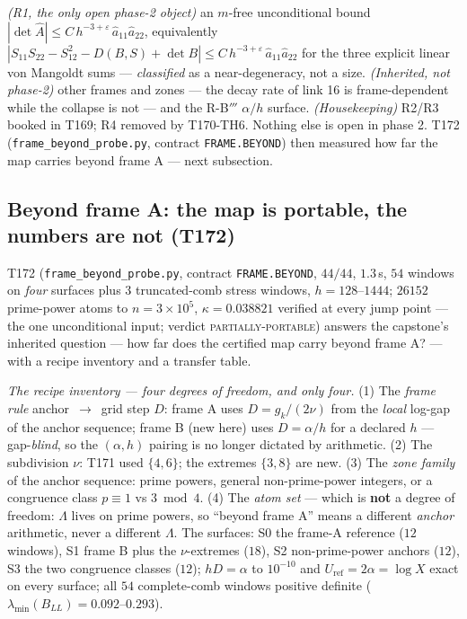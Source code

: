 \documentclass[11pt,a4paper]{article}
\begin{document}
\begin{keybox}
\emph{(R1, the only open phase-2 object)} an $m$-free unconditional
bound $|\det\hat A|\le C\,h^{-3+\varepsilon}\,\hat a_{11}\hat a_{22}$,
equivalently $|S_{11}S_{22}-S_{12}^2-D(B,S)+\det B|\le C\,
h^{-3+\varepsilon}\,\hat a_{11}\hat a_{22}$ for the three explicit
linear von Mangoldt sums --- \emph{classified} as a near-degeneracy,
not a size. \emph{(Inherited, not phase-2)} other frames and zones ---
the decay rate of link 16 is frame-dependent while the collapse is not
--- and the R-B$'''$ $\alpha/h$ surface. \emph{(Housekeeping)} R2/R3
booked in T169; R4 removed by T170-TH6. Nothing else is open in phase
2. T172 (\texttt{frame\_beyond\_probe.py}, contract
\texttt{FRAME.BEYOND}) then measured how far the map carries beyond
frame A --- next subsection.
\end{keybox}

\subsection{Beyond frame A: the map is portable, the numbers are not
(T172)}\label{sec:t172}
T172 (\texttt{frame\_beyond\_probe.py}, contract \texttt{FRAME.BEYOND},
$44/44$, $1.3$\,s, $54$ windows on \emph{four} surfaces plus $3$
truncated-comb stress windows, $h=128$--$1444$; $26152$ prime-power
atoms to $n=3\times10^{5}$, $\kappa=0.038821$ verified at every jump
point --- the one unconditional input; verdict
\textsc{partially-portable}) answers the capstone's inherited question
--- how far does the certified map carry beyond frame A? --- with a
recipe inventory and a transfer table.

\emph{The recipe inventory --- four degrees of freedom, and only four.}
(1) The \emph{frame rule} anchor~$\to$~grid step $D$: frame A uses
$D=g_k/(2\nu)$ from the \emph{local} log-gap of the anchor sequence;
frame B (new here) uses $D=\alpha/h$ for a declared $h$ ---
gap-\emph{blind}, so the $(\alpha,h)$ pairing is no longer dictated by
arithmetic. (2) The subdivision $\nu$: T171 used $\{4,6\}$; the extremes
$\{3,8\}$ are new. (3) The \emph{zone family} of the anchor sequence:
prime powers, general non-prime-power integers, or a congruence class
$p\equiv1$ vs $3\bmod4$. (4) The \emph{atom set} --- which is
\textbf{not} a degree of freedom: $\Lambda$ lives on prime powers, so
``beyond frame A'' means a different \emph{anchor} arithmetic, never a
different $\Lambda$. The surfaces: S0 the frame-A reference ($12$
windows), S1 frame B plus the $\nu$-extremes ($18$), S2 non-prime-power
anchors ($12$), S3 the two congruence classes ($12$); $hD=\alpha$ to
$10^{-10}$ and $U_{\mathrm{ref}}=2\alpha=\log X$ exact on every
surface; all $54$ complete-comb windows positive definite
($\lambda_{\min}(B_{LL})=0.092$--$0.293$).
\end{document}
